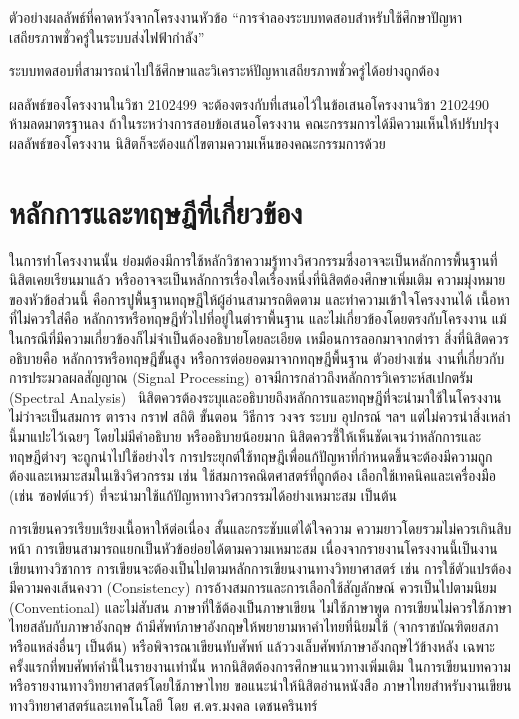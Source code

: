 \documentclass[11pt,a4paper]{article}
\begin{document}
ตัวอย่างผลลัพธ์ที่คาดหวังจากโครงงานหัวข้อ “การจำลองระบบทดสอบสำหรับใช้ศึกษาปัญหาเสถียรภาพชั่วครู่ในระบบส่งไฟฟ้ากำลัง”


ระบบทดสอบที่สามารถนำไปใช้ศึกษาและวิเคราะห์ปัญหาเสถียรภาพชั่วครู่ได้อย่างถูกต้อง


ผลลัพธ์ของโครงงานในวิชา 2102499 จะต้องตรงกับที่เสนอไว้ในข้อเสนอโครงงานวิชา 2102490 ห้ามลดมาตรฐานลง ถ้าในระหว่างการสอบข้อเสนอโครงงาน คณะกรรมการได้มีความเห็นให้ปรับปรุงผลลัพธ์ของโครงงาน นิสิตก็จะต้องแก้ไขตามความเห็นของคณะกรรมการด้วย

\section{หลักการและทฤษฎีที่เกี่ยวข้อง}
ในการทำโครงงานนั้น ย่อมต้องมีการใช้หลักวิชาความรู้ทางวิศวกรรมซึ่งอาจจะเป็นหลักการพื้นฐานที่นิสิตเคยเรียนมาแล้ว หรืออาจจะเป็นหลักการเรื่องใดเรื่องหนึ่งที่นิสิตต้องศึกษาเพิ่มเติม ความมุ่งหมายของหัวข้อส่วนนี้ คือการปูพื้นฐานทฤษฎีให้ผู้อ่านสามารถติดตาม และทำความเข้าใจโครงงานได้ เนื้อหาที่ไม่ควรใส่คือ หลักการหรือทฤษฎีทั่วไปที่อยู่ในตำราพื้นฐาน และไม่เกี่ยวข้องโดยตรงกับโครงงาน แม้ในกรณีที่มีความเกี่ยวข้องก็ไม่จำเป็นต้องอธิบายโดยละเอียด เหมือนการลอกมาจากตำรา สิ่งที่นิสิตควรอธิบายคือ หลักการหรือทฤษฎีขั้นสูง หรือการต่อยอดมาจากทฤษฎีพื้นฐาน ตัวอย่างเช่น งานที่เกี่ยวกับการประมวลผลสัญญาณ (Signal Processing) อาจมีการกล่าวถึงหลักการวิเคราะห์สเปกตรัม (Spectral Analysis)~\cite{StM:97} นิสิตควรต้องระบุและอธิบายถึงหลักการและทฤษฎีที่จะนำมาใช้ในโครงงาน ไม่ว่าจะเป็นสมการ ตาราง กราฟ สถิติ ขั้นตอน วิธีการ วงจร ระบบ อุปกรณ์ ฯลฯ แต่ไม่ควรนำสิ่งเหล่านี้มาแปะไว้เฉยๆ โดยไม่มีคำอธิบาย หรืออธิบายน้อยมาก นิสิตควรชี้ให้เห็นชัดเจนว่าหลักการและทฤษฎีต่างๆ จะถูกนำไปใช้อย่างไร การประยุกต์ใช้ทฤษฎีเพื่อแก้ปัญหาที่กำหนดขึ้นจะต้องมีความถูกต้องและเหมาะสมในเชิงวิศวกรรม เช่น ใช้สมการคณิตศาสตร์ที่ถูกต้อง เลือกใช้เทคนิคและเครื่องมือ (เช่น ซอฟต์แวร์) ที่จะนำมาใช้แก้ปัญหาทางวิศวกรรมได้อย่างเหมาะสม เป็นต้น


การเขียนควรเรียบเรียงเนื้อหาให้ต่อเนื่อง สั้นและกระชับแต่ได้ใจความ ความยาวโดยรวมไม่ควรเกินสิบหน้า การเขียนสามารถแยกเป็นหัวข้อย่อยได้ตามความเหมาะสม เนื่องจากรายงานโครงงานนี้เป็นงานเขียนทางวิชาการ การเขียนจะต้องเป็นไปตามหลักการเขียนงานทางวิทยาศาสตร์ เช่น การใช้ตัวแปรต้องมีความคงเส้นคงวา (Consistency) การอ้างสมการและการเลือกใช้สัญลักษณ์ ควรเป็นไปตามนิยม (Conventional) และไม่สับสน ภาษาที่ใช้ต้องเป็นภาษาเขียน ไม่ใช้ภาษาพูด การเขียนไม่ควรใช้ภาษาไทยสลับกับภาษาอังกฤษ ถ้ามีศัพท์ภาษาอังกฤษให้พยายามหาคำไทยที่นิยมใช้ (จากราชบัณฑิตยสภา หรือแหล่งอื่นๆ เป็นต้น) หรือพิจารณาเขียนทับศัพท์ แล้ววงเล็บศัพท์ภาษาอังกฤษไว้ข้างหลัง เฉพาะครั้งแรกที่พบศัพท์คำนี้ในรายงานเท่านั้น หากนิสิตต้องการศึกษาแนวทางเพิ่มเติม ในการเขียนบทความหรือรายงานทางวิทยาศาสตร์โดยใช้ภาษาไทย ขอแนะนำให้นิสิตอ่านหนังสือ ภาษาไทยสำหรับงานเขียนทางวิทยาศาสตร์และเทคโนโลยี โดย ศ.ดร.มงคล เดชนครินทร์
\end{document}
